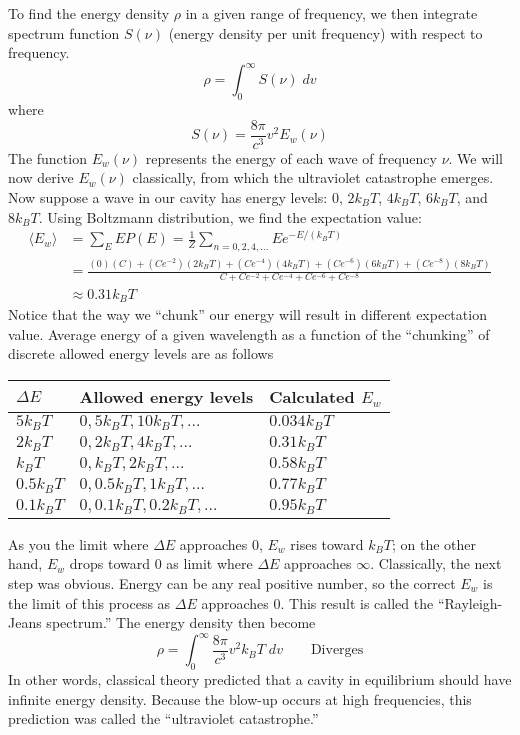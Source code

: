 \documentclass[../main.tex]{subfiles}
\begin{document}
To find the energy density $\rho$ in a given range of frequency, we then integrate spectrum function $S(\nu)$ (energy density per unit frequency) with respect to frequency. 
\begin{equation*}
    \rho=\int_{0}^{\infty}S(\nu)\;dv
\end{equation*}
where
\begin{equation*}
    S(\nu)=\frac{8\pi}{c^3}v^2E_w(\nu)
\end{equation*}
The function $E_w(\nu)$ represents the energy of each wave of frequency $\nu$. We will now derive $E_w(\nu)$ classically, from which the ultraviolet catastrophe emerges. Now suppose a wave in our cavity has energy levels: $0$, $2k_B T$, $4k_B T$, $6k_B T$, and $8k_B T$. Using Boltzmann distribution, we find the expectation value:
\begin{align*}
    \langle E_w\rangle&=\sum_{E}^{}EP(E)=\frac{1}{Z}\sum_{n=0,2,4,\dots}^{}Ee^{-E/(k_BT)}\\
    &=\frac{(0)(C)+(Ce^{-2})(2k_B T)+(Ce^{-4})(4k_B T)+(Ce^{-6})(6k_B T)+(Ce^{-8})(8k_B T)}{C+Ce^{-2}+Ce^{-4}+Ce^{-6}+Ce^{-8}}\\
    &\approx 0.31k_B T
\end{align*}
Notice that the way we “chunk” our energy will result in different expectation value. Average energy of a given wavelength as a function of the “chunking” of discrete allowed energy levels are as follows
\begin{center}
    \begin{longtable}{|p{}|p{}|p{}|}
        \hline
        $\Delta E$&Allowed energy levels&Calculated $E_w$\\\hline\hline
        $5k_B T$&$0, 5k_B T, 10k_B T, \dots$&$0.034k_B T$\\
        $2k_B T$&$0, 2k_B T, 4k_B T, \dots$&$0.31k_B T$\\
        $k_B T$&$0, k_B T, 2k_B T, \dots$&$0.58k_B T$\\
        $0.5k_B T$&$0, 0.5k_B T, 1k_B T, \dots$&$0.77k_B T$\\
        $0.1k_B T$&$0, 0.1k_B T, 0.2k_B T, \dots$&$0.95k_B T$\\\hline
    \end{longtable}
\end{center}
As you the limit where $\Delta E$ approaches $0$, $E_w$ rises toward $k_B T$; on the other hand, $E_w$ drops toward $0$ as limit where $\Delta E$ approaches $\infty$. Classically, the next step was obvious. Energy can be any real positive number, so the correct $E_w$ is the limit of this process as $\Delta E$ approaches $0$. This result is called the “Rayleigh-Jeans spectrum.” The energy density then become
\begin{equation*}
    \rho=\int_{0}^{\infty}\frac{8\pi}{c^3}v^2k_B T\;dv\qquad\text{Diverges}
\end{equation*}
In other words, classical theory predicted that a cavity in equilibrium should have infinite energy density. Because the blow-up occurs at high frequencies, this prediction was called the “ultraviolet catastrophe.”
\end{document}
